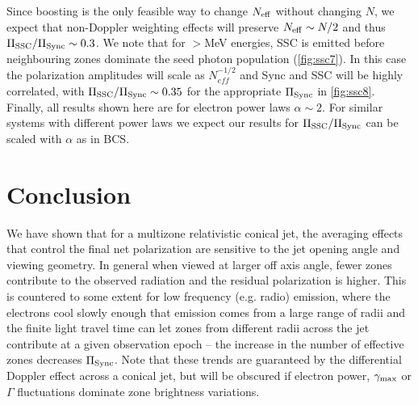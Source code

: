Since boosting is the only feasible way to change $N_{\rm eff}$ without changing $N$, we expect that non-Doppler weighting effects will preserve $N_{\rm eff} \sim N/2$ and thus $\Pi_{\rm SSC}/\Pi_{\rm Sync} \sim 0.3$.
We note that for $>$MeV energies, SSC is emitted before neighbouring zones dominate the seed photon population (\cref{fig:ssc7}). In this case the polarization amplitudes will scale as $N_{eff}^{-1/2}$ and Sync and SSC will be highly correlated, with $\Pi_{\rm SSC}/\Pi_{\rm Sync} \sim 0.35$ for the appropriate $\Pi_{\rm Sync}$ in \cref{fig:ssc8}.
Finally, all results shown here are for electron power laws $\alpha \sim 2$. For similar systems with different power laws we expect our results for $\Pi_{\rm SSC}/\Pi_{\rm Sync}$ can be scaled with $\alpha$ as in BCS. %

\section{Conclusion}

We have shown that for a multizone relativistic conical jet, the averaging effects that control the final net polarization are sensitive to the jet opening angle and viewing geometry. In general when viewed at larger off axis angle, fewer zones contribute to the observed radiation and the residual polarization is higher. This is countered to some extent for low frequency (e.g. radio) emission, where the electrons cool slowly enough that emission comes from a large range of radii and the finite light travel time can let zones from different radii across the jet contribute at a given observation epoch -- the increase in the number of effective zones decreases $\Pi_{\rm Sync}$. Note that these trends are guaranteed by the differential Doppler effect across a conical jet, but will be obscured if electron power, $\gamma_{\rm max}$ or $\Gamma$ fluctuations dominate zone brightness variations.

